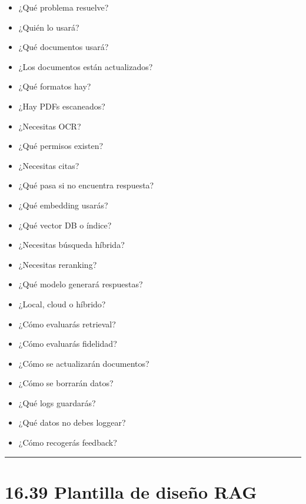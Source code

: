 \begin{itemize}
\tightlist
\item
  ¿Qué problema resuelve?
\item
  ¿Quién lo usará?
\item
  ¿Qué documentos usará?
\item
  ¿Los documentos están actualizados?
\item
  ¿Qué formatos hay?
\item
  ¿Hay PDFs escaneados?
\item
  ¿Necesitas OCR?
\item
  ¿Qué permisos existen?
\item
  ¿Necesitas citas?
\item
  ¿Qué pasa si no encuentra respuesta?
\item
  ¿Qué embedding usarás?
\item
  ¿Qué vector DB o índice?
\item
  ¿Necesitas búsqueda híbrida?
\item
  ¿Necesitas reranking?
\item
  ¿Qué modelo generará respuestas?
\item
  ¿Local, cloud o híbrido?
\item
  ¿Cómo evaluarás retrieval?
\item
  ¿Cómo evaluarás fidelidad?
\item
  ¿Cómo se actualizarán documentos?
\item
  ¿Cómo se borrarán datos?
\item
  ¿Qué logs guardarás?
\item
  ¿Qué datos no debes loggear?
\item
  ¿Cómo recogerás feedback?
\end{itemize}

\begin{center}\rule{0.5\linewidth}{0.5pt}\end{center}

\section{16.39 Plantilla de diseño
RAG}\label{plantilla-de-diseuxf1o-rag}

